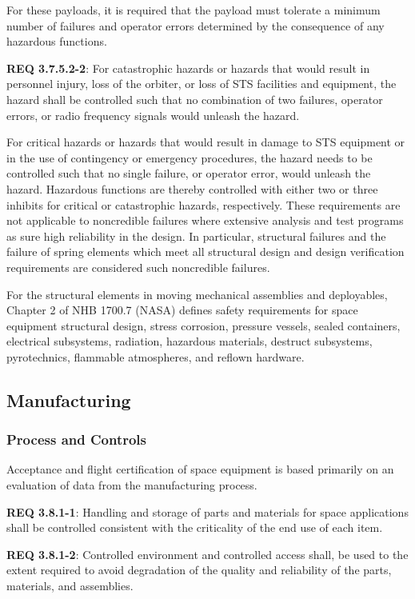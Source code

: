 \documentclass[12pt]{article}
\begin{document}
For these payloads, it is required that the payload must tolerate a minimum number of failures and operator errors determined by the consequence of any hazardous functions. 

\noindent \textbf{REQ 3.7.5.2-2}: For catastrophic hazards or hazards that would result in personnel injury, loss of the orbiter, or loss of STS facilities and equipment, the hazard shall be controlled such that no combination of two failures, operator errors, or radio frequency signals would unleash the hazard. 

For critical hazards or hazards that would result in damage to STS equipment or in the use of contingency or emergency procedures, the hazard needs to be controlled such that no single failure, or operator error, would unleash the hazard. 
Hazardous functions are thereby controlled with either two or three inhibits for critical or catastrophic hazards, respectively. 
These requirements are not applicable to noncredible failures where extensive analysis and test programs as sure high reliability in the design. 
In particular, structural failures and the failure of spring elements which meet all structural design and design verification requirements are considered such noncredible failures.

For the structural elements in moving mechanical assemblies and deployables, Chapter 2 of NHB 1700.7 (NASA) defines safety requirements for space equipment structural design, stress corrosion, pressure vessels, sealed containers, electrical subsystems, radiation, hazardous materials, destruct subsystems, pyrotechnics, flammable atmospheres, and reflown hardware.


\clearpage
\subsection{Manufacturing} %
\subsubsection{Process and Controls} %
Acceptance and flight certification of space equipment is based primarily on an evaluation of data from the manufacturing process. 

\noindent \textbf{REQ 3.8.1-1}: Handling and storage of parts and materials for space applications shall be controlled consistent with the criticality of the end use of each item. 

\noindent \textbf{REQ 3.8.1-2}: Controlled environment and controlled access shall, be used to the extent required to avoid degradation of the quality and reliability of the parts, materials, and assemblies. 
\end{document}
